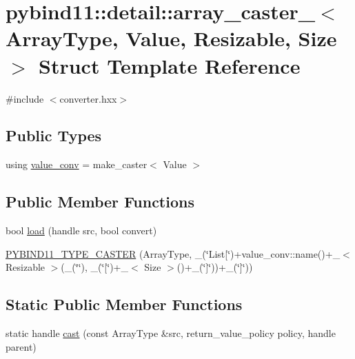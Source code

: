 \hypertarget{structpybind11_1_1detail_1_1array__caster__}{}\section{pybind11\+:\+:detail\+:\+:array\+\_\+caster\+\_\+$<$ Array\+Type, Value, Resizable, Size $>$ Struct Template Reference}
\label{structpybind11_1_1detail_1_1array__caster__}


{\ttfamily \#include $<$converter.\+hxx$>$}

\subsection*{Public Types}
\begin{DoxyCompactItemize}
\item 
using \hyperlink{structpybind11_1_1detail_1_1array__caster___a39e6e57cd2c8ab3c8cc81ee85fcfbcc6}{value\+\_\+conv} = make\+\_\+caster$<$ Value $>$
\end{DoxyCompactItemize}
\subsection*{Public Member Functions}
\begin{DoxyCompactItemize}
\item 
bool \hyperlink{structpybind11_1_1detail_1_1array__caster___a26ad1fb7dab7c82cd832c8c3a356fead}{load} (handle src, bool convert)
\item 
\hyperlink{structpybind11_1_1detail_1_1array__caster___a1feb38428c22749e65c159c0e63b9eb7}{P\+Y\+B\+I\+N\+D11\+\_\+\+T\+Y\+P\+E\+\_\+\+C\+A\+S\+T\+ER} (Array\+Type, \+\_\+(\char`\"{}List\mbox{[}\char`\"{})+value\+\_\+conv\+::name()+\+\_\+$<$ Resizable $>$(\+\_\+(\char`\"{}\char`\"{}), \+\_\+(\char`\"{}\mbox{[}\char`\"{})+\+\_\+$<$ Size $>$()+\+\_\+(\char`\"{}\mbox{]}\char`\"{}))+\+\_\+(\char`\"{}\mbox{]}\char`\"{}))
\end{DoxyCompactItemize}
\subsection*{Static Public Member Functions}
\begin{DoxyCompactItemize}
\item 
static handle \hyperlink{structpybind11_1_1detail_1_1array__caster___a5b2accfaf6b0ca00cb250a511d7e037a}{cast} (const Array\+Type \&src, return\+\_\+value\+\_\+policy policy, handle parent)
\end{DoxyCompactItemize}


